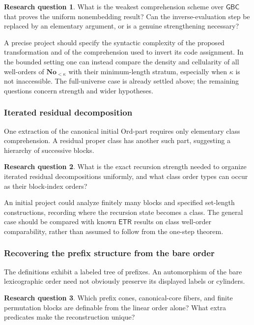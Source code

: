 \documentclass[11pt]{article}
\theoremstyle{definition}
\newtheorem{question}[question]{Research question}
\theoremstyle{remark}
\newcommand{\No}{\mathbf{No}}
\newcommand{\Ord}{\mathrm{Ord}}
\newcommand{\GBC}{\mathsf{GBC}}
\newcommand{\ETR}{\mathsf{ETR}}
\begin{document}
\begin{question}\label{swo:n16.2}
What is the weakest comprehension scheme over \(\GBC\)
that proves the uniform nonembedding result? Can the
inverse-evaluation step be replaced by an elementary
argument, or is a genuine strengthening necessary?
\end{question}

A precise project should specify the syntactic complexity
of the proposed transformation and of the comprehension
used to invert its code assignment. In the bounded
setting one can instead compare the density and
cellularity of all well-orders of \(\No_{<\kappa}\)
with their minimum-length stratum, especially when
\(\kappa\) is not inaccessible. The full-universe case
is already settled above; the remaining questions
concern strength and wider hypotheses.

\subsubsection{Iterated residual decomposition}

One extraction of the canonical initial \(\Ord\)-part
requires only elementary class comprehension. A residual
proper class has another such part, suggesting a hierarchy
of successive blocks.

\begin{question}\label{swo:n16.3}
What is the exact recursion strength needed to organize
iterated residual decompositions uniformly, and what
class order types can occur as their block-index orders?
\end{question}

An initial project could analyze finitely many blocks and
specified set-length constructions, recording where the
recursion state becomes a class. The general case should
be compared with known \(\ETR\) results on class
well-order comparability, rather than assumed to follow
from the one-step theorem.

\subsubsection{Recovering the prefix structure from the bare order}

The definitions exhibit a labeled tree of prefixes.
An automorphism of the bare lexicographic order need not
obviously preserve its displayed labels or cylinders.

\begin{question}\label{swo:n16.4}
Which prefix cones, canonical-core fibers, and finite
permutation blocks are definable from the linear order
alone? What extra predicates make the reconstruction
unique?
\end{question}
\end{document}
